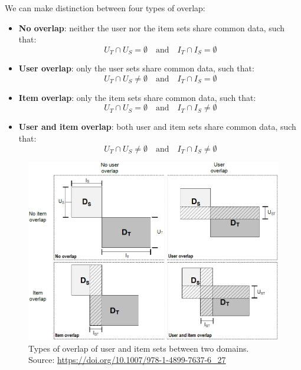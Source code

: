 We can make distinction between four types of overlap:
\begin{itemize}
\item \textbf{No overlap}: neither the user nor the item sets share common data, such that:
\begin{equation*}
U_T \cap U_S = \emptyset \quad \text{and} \quad I_T \cap I_S = \emptyset
\end{equation*}
\item \textbf{User overlap}: only the user sets share common data, such that:
\begin{equation*}
U_T \cap U_S \neq \emptyset \quad \text{and} \quad I_T \cap I_S = \emptyset
\end{equation*}
\item \textbf{Item overlap}: only the item sets share common data, such that:
\begin{equation*}
U_T \cap U_S = \emptyset \quad \text{and} \quad I_T \cap I_S \neq \emptyset
\end{equation*}
\item \textbf{User and item overlap}: both user and item sets share common data, such that:
\begin{equation*}
U_T \cap U_S \neq \emptyset \quad \text{and} \quad I_T \cap I_S \neq \emptyset
\end{equation*}
\end{itemize}
\begin{figure}[hbt]
\centering
\includegraphics[width=\textwidth]{pictures/domains-overlap}
\caption{Types of overlap of user and item sets between two domains.\\
Source: \url{https://doi.org/10.1007/978-1-4899-7637-6\_27}}
\end{figure}


